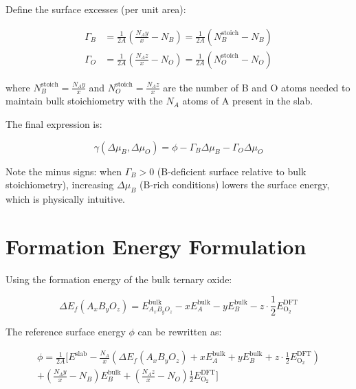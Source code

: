 \documentclass[11pt]{article}
\begin{document}
Define the surface excesses (per unit area):

\begin{align}
\Gamma_B &= \frac{1}{2A} \left(\frac{N_A y}{x} - N_B\right) = \frac{1}{2A} \left(N_B^{\text{stoich}} - N_B\right) \label{eq:Gamma_B} \\
\Gamma_O &= \frac{1}{2A} \left(\frac{N_A z}{x} - N_O\right) = \frac{1}{2A} \left(N_O^{\text{stoich}} - N_O\right) \label{eq:Gamma_O}
\end{align}

where $N_B^{\text{stoich}} = \frac{N_A y}{x}$ and $N_O^{\text{stoich}} = \frac{N_A z}{x}$ are the number of B and O atoms needed to maintain bulk stoichiometry with the $N_A$ atoms of A present in the slab.

The final expression is:

\begin{equation}
\boxed{\gamma(\Delta\mu_B, \Delta\mu_O) = \phi - \Gamma_B \Delta\mu_B - \Gamma_O \Delta\mu_O}
\label{eq:gamma_final}
\end{equation}

Note the minus signs: when $\Gamma_B > 0$ (B-deficient surface relative to bulk stoichiometry), increasing $\Delta\mu_B$ (B-rich conditions) lowers the surface energy, which is physically intuitive.

\section{Formation Energy Formulation}

Using the formation energy of the bulk ternary oxide:

\begin{equation}
\Delta E_f(A_xB_yO_z) = E_{A_xB_yO_z}^{\text{bulk}} - x E_A^{\text{bulk}} - y E_B^{\text{bulk}} - z \cdot \frac{1}{2} E_{\text{O}_2}^{\text{DFT}}
\label{eq:formation_energy}
\end{equation}

The reference surface energy $\phi$ can be rewritten as:

\begin{multline}
\phi = \frac{1}{2A} \Bigg[ E^{\text{slab}} - \frac{N_A}{x} \left( \Delta E_f(A_xB_yO_z) + x E_A^{\text{bulk}} + y E_B^{\text{bulk}} + z \cdot \frac{1}{2} E_{\text{O}_2}^{\text{DFT}} \right) \\
+ \left(\frac{N_A y}{x} - N_B\right) E_B^{\text{bulk}} + \left(\frac{N_A z}{x} - N_O\right) \frac{1}{2} E_{\text{O}_2}^{\text{DFT}} \Bigg]
\label{eq:phi_with_formation}
\end{multline}
\end{document}
